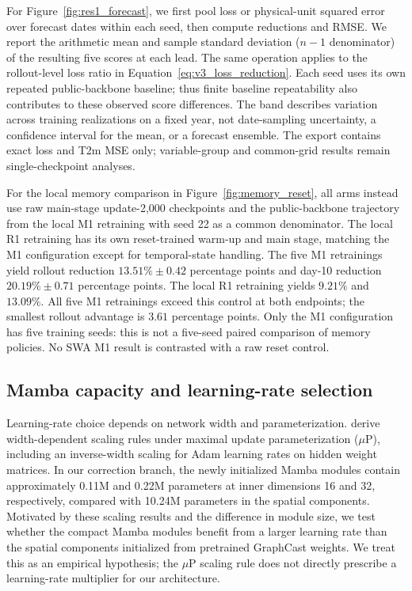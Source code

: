 \documentclass{article}
\newcommand{\vfourchange}[1]{{\color{blue}#1}}
\begin{document}
\vfourchange{For Figure~\ref{fig:res1_forecast}, we first pool loss or physical-unit squared error over forecast dates within each seed, then compute reductions and RMSE. We report the arithmetic mean and sample standard deviation ($n-1$ denominator) of the resulting five scores at each lead. The same operation applies to the rollout-level loss ratio in Equation~\ref{eq:v3_loss_reduction}. Each seed uses its own repeated public-backbone baseline; thus finite baseline repeatability also contributes to these observed score differences. The band describes variation across training realizations on a fixed year, not date-sampling uncertainty, a confidence interval for the mean, or a forecast ensemble. The export contains exact loss and T2m MSE only; variable-group and common-grid results remain single-checkpoint analyses.}

\vfourchange{For the local memory comparison in Figure~\ref{fig:memory_reset}, all arms instead use raw main-stage update-2,000 checkpoints and the public-backbone trajectory from the local M1 retraining with seed 22 as a common denominator. The local \vfourchange{R1} retraining has its own reset-trained warm-up and main stage, matching the M1 configuration except for temporal-state handling. The five M1 retrainings yield rollout reduction $13.51\%\pm0.42$ percentage points and day-10 reduction $20.19\%\pm0.71$ percentage points. The local \vfourchange{R1} retraining yields $9.21\%$ and $13.09\%$. All five M1 retrainings exceed this control at both endpoints; the smallest rollout advantage is $3.61$ percentage points. Only the M1 configuration has five training seeds: this is not a five-seed paired comparison of memory policies. No SWA M1 result is contrasted with a raw reset control.}

\subsection{\texorpdfstring{{Mamba capacity and learning-rate selection}}{Mamba capacity and learning-rate selection}}
\label{sec:training_sensitivity}

{Learning-rate choice depends on network width and parameterization. \citet{yang2022tensorprogramsv} derive width-dependent scaling rules under maximal update parameterization ($\mu$P), including an inverse-width scaling for Adam learning rates on hidden weight matrices. In our correction branch, the newly initialized Mamba modules contain approximately 0.11M and 0.22M parameters at inner dimensions 16 and 32, respectively, compared with 10.24M parameters in the spatial components. Motivated by these scaling results and the difference in module size, we test whether the compact Mamba modules benefit from a larger learning rate than the spatial components initialized from pretrained GraphCast weights. We treat this as an empirical hypothesis; the $\mu$P scaling rule does not directly prescribe a learning-rate multiplier for our architecture.}
\end{document}
